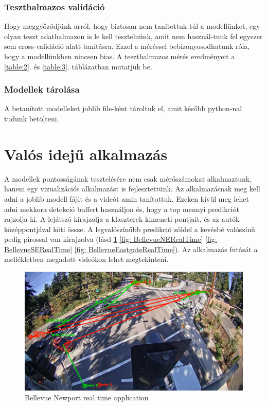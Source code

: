 \documentclass[acmtog, authorversion]{acmart}
\begin{document}
\subsubsection{Teszthalmazos validáció}
Hogy meggyőződjünk arról, hogy biztosan nem tanítottuk túl a modellünket, egy olyan teszt adathalmazon is le kell tesztelnünk, amit nem használ-tunk fel egyszer sem
cross-validáció alatt tanításra. Ezzel a méréssel bebizonyosodhatunk róla, hogy a modellünkben nincsen bias. A teszthalmazos mérés eredményeit a \ref{table:2}. és \ref{table:3}.
táblázatban mutatjuk be.
\subsubsection{Modellek tárolása}
A betanított modelleket joblib file-ként tároltuk el, amit később python-nal tudunk betölteni.

\section{Valós idejű alkalmazás}
A modellek pontosságának tesztelésére nem csak mérőszámokat alkalmaztunk, hanem egy vizualizációs alkalmazást is fejlesztettünk. Az alkalmazásnak meg kell adni
a joblib modell fájlt és a videót amin tanítottuk. Ezeken kívül meg lehet adni mekkora detekció buffert használjon és, hogy a top mennyi predikciót rajzolja ki.
A lejátszó kirajzolja a klaszterek kimeneti pontjait, és az autók középpontjával köti össze. A legvalószínűbb predikció zöldel a kevésbé valószínű pedig pirossal
van kirajzolva (lásd \ref{BellevueNewportRealTime} \ref{fig: BellevueNERealTime} \ref{fig: BellevueSERealTime} \ref{fig: BellevueEastgateRealTime}). 
Az alkalmazás futását a mellékletben megadott videókon lehet megtekinteni.

\begin{figure}[H]
    \includegraphics[width=1\columnwidth]{visualization/bellevue_newport.png}
    \caption{Bellevue Newport real time application}
    \label{BellevueNewportRealTime}
\end{figure}
\end{document}
